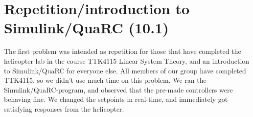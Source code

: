 \section{Repetition/introduction to Simulink/QuaRC (10.1)}

The first problem was intended as repetition for those that have completed the helicopter lab in the course TTK4115 Linear System Theory, and an introduction to Simulink/QuaRC for everyone else. All members of our group have completed TTK4115, so we didn't use much time on this problem. We ran the Simulink/QuaRC-program, and observed that the pre-made controllers were behaving fine. We changed the setpoints in real-time, and immediately got satisfying responses from the helicopter.